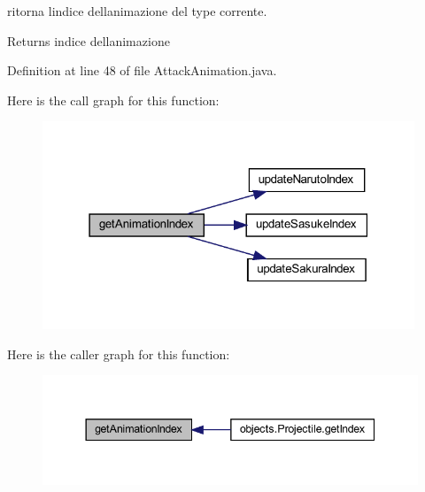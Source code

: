 ritorna l\textquotesingle{}indice dell\textquotesingle{}animazione del type corrente. 

\begin{DoxyReturn}{Returns}
indice dell\textquotesingle{}animazione 
\end{DoxyReturn}


Definition at line 48 of file Attack\+Animation.\+java.

Here is the call graph for this function\+:\nopagebreak
\begin{figure}[H]
\begin{center}
\leavevmode
\includegraphics[width=315pt]{classtowers_1_1_attack_animation_ae8c4fe920791c4525eb1a9ab79d1e3b7_cgraph}
\end{center}
\end{figure}
Here is the caller graph for this function\+:\nopagebreak
\begin{figure}[H]
\begin{center}
\leavevmode
\includegraphics[width=344pt]{classtowers_1_1_attack_animation_ae8c4fe920791c4525eb1a9ab79d1e3b7_icgraph}
\end{center}
\end{figure}
\mbox{\label{classtowers_1_1_attack_animation_a9a43224ece8c2b408bea79a17a40926a}} 
